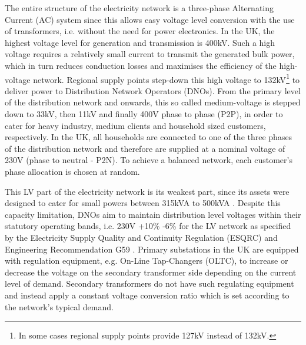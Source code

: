 The entire structure of the electricity network is a three-phase Alternating Current (AC) system since this allows easy voltage level conversion with the use of transformers, i.e. without the need for power electronics.
In the UK, the highest voltage level for generation and transmission is 400kV.
Such a high voltage requires a relatively small current to transmit the generated bulk power, which in turn reduces conduction losses and maximises the efficiency of the high-voltage network.
Regional supply points step-down this high voltage to 132kV\footnote{In some cases regional supply points provide 127kV instead of 132kV.} to deliver power to Distribution Network Operators (DNOs).
From the primary level of the distribution network and onwards, this so called medium-voltage is stepped down to 33kV, then 11kV and finally 400V phase to phase (P2P), in order to cater for heavy industry, medium clients and household sized customers, respectively.
In the UK, all households are connected to one of the three phases of the distribution network and therefore are supplied at a nominal voltage of 230V (phase to neutral - P2N).
To achieve a balanced network, each customer's phase allocation is chosen at random.


This LV part of the electricity network is its weakest part, since its assets were designed to cater for small powers between 315kVA to 500kVA \cite{EDS08-0115}.
Despite this capacity limitation, DNOs aim to maintain distribution level voltages within their statutory operating bands, i.e. 230V +10\% -6\% for the LV network as specified by the Electricity Supply Quality and Continuity Regulation (ESQRC) \cite{HealthandSafetyExecutive2002} and Engineering Recommendation G59 \cite{EnergyNetworksAssociation2013}.
Primary substations in the UK are equipped with regulation equipment, e.g. On-Line Tap-Changers (OLTC), to increase or decrease the voltage on the secondary transformer side depending on the current level of demand.
Secondary transformers do not have such regulating equipment and instead apply a constant voltage conversion ratio which is set according to the network's typical demand.

